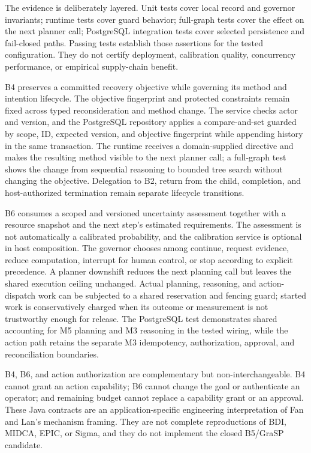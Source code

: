 The evidence is deliberately layered. Unit tests cover local record and governor invariants; runtime tests cover guard behavior; full-graph tests cover the effect on the next planner call; PostgreSQL integration tests cover selected persistence and fail-closed paths. Passing tests establish those assertions for the tested configuration. They do not certify deployment, calibration quality, concurrency performance, or empirical supply-chain benefit.

\begin{chapterrecap}
B4 preserves a committed recovery objective while governing its method and intention lifecycle. The objective fingerprint and protected constraints remain fixed across typed reconsideration and method change. The service checks actor and version, and the PostgreSQL repository applies a compare-and-set guarded by scope, ID, expected version, and objective fingerprint while appending history in the same transaction. The runtime receives a domain-supplied directive and makes the resulting method visible to the next planner call; a full-graph test shows the change from sequential reasoning to bounded tree search without changing the objective. Delegation to B2, return from the child, completion, and host-authorized termination remain separate lifecycle transitions.

B6 consumes a scoped and versioned uncertainty assessment together with a resource snapshot and the next step's estimated requirements. The assessment is not automatically a calibrated probability, and the calibration service is optional in host composition. The governor chooses among continue, request evidence, reduce computation, interrupt for human control, or stop according to explicit precedence. A planner downshift reduces the next planning call but leaves the shared execution ceiling unchanged. Actual planning, reasoning, and action-dispatch work can be subjected to a shared reservation and fencing guard; started work is conservatively charged when its outcome or measurement is not trustworthy enough for release. The PostgreSQL test demonstrates shared accounting for M5 planning and M3 reasoning in the tested wiring, while the action path retains the separate M3 idempotency, authorization, approval, and reconciliation boundaries.

B4, B6, and action authorization are complementary but non-interchangeable. B4 cannot grant an action capability; B6 cannot change the goal or authenticate an operator; and remaining budget cannot replace a capability grant or an approval. These Java contracts are an application-specific engineering interpretation of Fan and Lan's mechanism framing. They are not complete reproductions of BDI, MIDCA, EPIC, or Sigma, and they do not implement the closed B5/GraSP candidate.
\end{chapterrecap}

